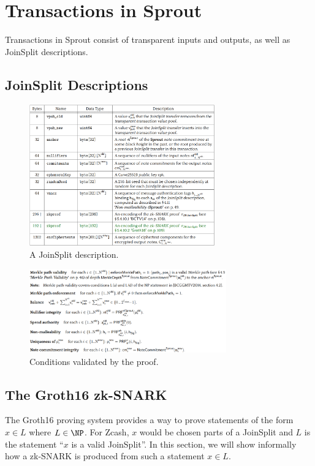 \documentclass{article}
\begin{document}
\section{Transactions in Sprout}

Transactions in Sprout consist of transparent inputs and outputs, as well as JoinSplit descriptions.

\subsection{JoinSplit Descriptions}

\begin{figure}[t]
\includegraphics[width=8cm]{images/joinsplit.png}
\caption{A JoinSplit description.} \label{fig:joinsplit}
\centering
\end{figure}

\begin{figure}[t]
\includegraphics[width=8.5cm]{images/proofconditions.png}
\caption{Conditions validated by the proof.} \label{fig:joinsplit}
\centering
\end{figure}

\subsection{The Groth16 zk-SNARK}

The Groth16 proving system provides a way to prove statements of the form $x \in L$ where $L \in \NP$.
For Zcash, $x$ would be chosen parts of a JoinSplit and $L$ is the statement ``$x$ is a valid JoinSplit''.
In this section, we will show informally how a zk-SNARK is produced from such a statement $x \in L$.
\end{document}
